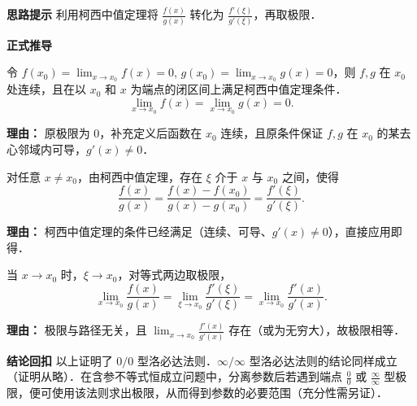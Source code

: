 \begin{proofbox}
	\textbf{\textcolor{CProof}{思路提示}}
	利用柯西中值定理将 $\frac{f(x)}{g(x)}$ 转化为 $\frac{f'(\xi)}{g'(\xi)}$，再取极限．

	\medskip
	\textbf{\textcolor{CProof}{正式推导}}
	\begin{description}[style=nextline, leftmargin=2.8em, labelsep=0.5em, itemsep=0.55em]
		\item[\textbf{步骤一（补充定义）：}]
			令 $f(x_0)=\lim_{x\to x_0}f(x)=0$, $g(x_0)=\lim_{x\to x_0}g(x)=0$，则 $f,g$ 在 $x_0$ 处连续，且在以 $x_0$ 和 $x$ 为端点的闭区间上满足柯西中值定理条件．
			\[
				\lim_{x\to x_0}f(x)=\lim_{x\to x_0}g(x)=0.
			\]
			\par\textbf{理由：} 原极限为 $0$，补充定义后函数在 $x_0$ 连续，且原条件保证 $f,g$ 在 $x_0$ 的某去心邻域内可导，$g'(x)\neq0$．
		\item[\textbf{步骤二（柯西中值）：}]
			对任意 $x\neq x_0$，由柯西中值定理，存在 $\xi$ 介于 $x$ 与 $x_0$ 之间，使得
			\[
				\frac{f(x)}{g(x)} = \frac{f(x)-f(x_0)}{g(x)-g(x_0)} = \frac{f'(\xi)}{g'(\xi)}.
			\]
			\par\textbf{理由：} 柯西中值定理的条件已经满足（连续、可导、$g'(x)\neq0$），直接应用即得．
		\item[\textbf{步骤三（取极限）：}]
			当 $x\to x_0$ 时，$\xi\to x_0$，对等式两边取极限，
			\[
				\lim_{x\to x_0}\frac{f(x)}{g(x)} = \lim_{\xi\to x_0}\frac{f'(\xi)}{g'(\xi)} = \lim_{x\to x_0}\frac{f'(x)}{g'(x)}.
			\]
			\par\textbf{理由：} 极限与路径无关，且 $\displaystyle\lim_{x\to x_0}\frac{f'(x)}{g'(x)}$ 存在（或为无穷大），故极限相等．
	\end{description}

	\medskip
	\textbf{\textcolor{CProof}{结论回扣}}
	以上证明了 $0/0$ 型洛必达法则．$\infty/\infty$ 型洛必达法则的结论同样成立（证明从略）．在含参不等式恒成立问题中，分离参数后若遇到端点 $\frac{0}{0}$ 或 $\frac{\infty}{\infty}$ 型极限，便可使用该法则求出极限，从而得到参数的必要范围（充分性需另证）．
\end{proofbox}
